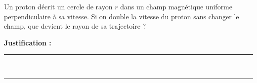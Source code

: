 Un proton décrit un cercle de rayon $r$ dans un champ magnétique uniforme perpendiculaire à sa vitesse. Si on double la vitesse du proton sans changer le champ, que devient le rayon de sa trajectoire ?

\choices

\noindent\textbf{Justification :} \hrulefill \\[2.5ex]
\rule{\linewidth}{0.4pt} \\[2.5ex]
\rule{\linewidth}{0.4pt}
\vfill
